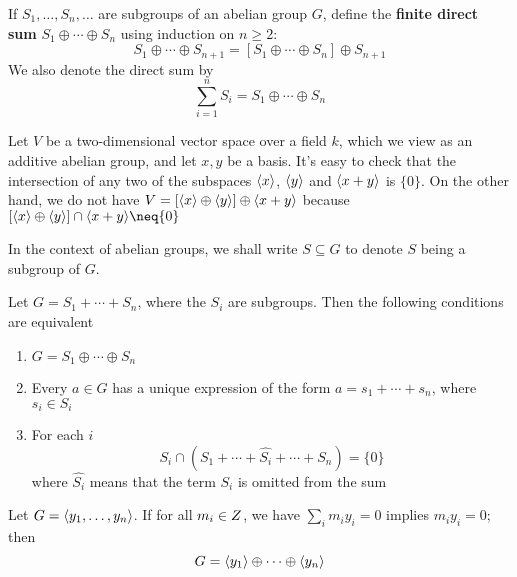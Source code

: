 \documentclass[11pt]{article}
\begin{document}
\begin{definition}[]
If \(S_1,\dots,S_n,\dots\) are subgroups of an abelian group \(G\), define the
\textbf{finite direct sum} \(S_1\oplus\cdots\oplus S_n\) using induction on
\(n\ge2\):
\begin{equation*}
S_1\oplus\cdots\oplus S_{n+1}=[S_1\oplus\cdots\oplus S_n]\oplus S_{n+1}
\end{equation*}
We also denote the direct sum by
\begin{equation*}
\displaystyle\sum_{i=1}^nS_i=S_1\oplus\cdots\oplus S_n
\end{equation*}
\end{definition}

\begin{examplle}[]
Let \(V\) be a two-dimensional vector space over a field \(k\), which we view as
an additive abelian group, and let \(x,y\) be a basis. It's easy to check
that the intersection of any two of the subspaces \(\langle x\rangle\), 
\(\langle y\rangle\) and \(\langle x+y\rangle\) is \(\{0\}\). On the other hand, we do not
have
\(V=[\langle x\rangle\oplus\langle y\rangle]\oplus\langle x+y\rangle\) because
\([\la x\ra\oplus\la y\ra]\cap\la x+y\ra\neq\{0\}\)
\end{examplle}

In the context of abelian groups, we shall write \(S\subseteq G\) to denote
\(S\) being a subgroup of \(G\).


\begin{proposition}[]
\label{prop5.4}
Let \(G=S_1+\cdots+S_n\), where the \(S_i\) are subgroups. Then the following
conditions are equivalent
\begin{enumerate}
\item \(G=S_1\oplus\cdots\oplus S_n\)
\item Every \(a\in G\) has a unique expression of the form
\(a=s_1+\cdots+s_n\), where \(s_i\in S_i\)
\item For each \(i\)
\begin{equation*}
S_i\cap(S_1+\cdots+\widehat{S_i}+\cdots+S_n)=\{0\}
\end{equation*}
where \(\widehat{S_i}\) means that the term \(S_i\) is omitted from the
sum
\end{enumerate}
\end{proposition}

\begin{corollary}[]
Let \(G=\langle y_1,\dots,y_n\rangle\). If for all \(m_i\in\relax{Z}\), we have
\(\sum_im_iy_i=0\) implies \(m_iy_i=0\); then
\begin{equation*}
G=\langle y_1\rangle\oplus\cdots\oplus\langle y_n\rangle
\end{equation*}
\end{corollary}
\end{document}
